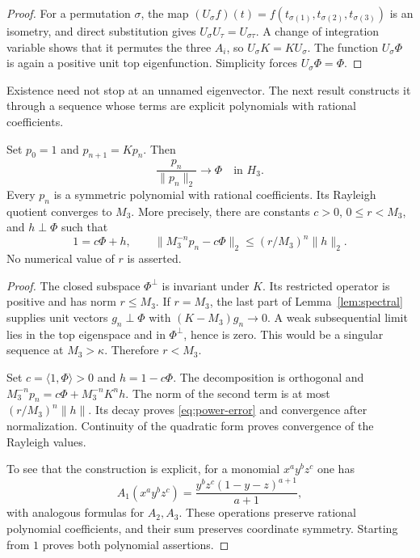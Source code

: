 \documentclass[11pt]{article}
\newcommand{\ip}[2]{\langle #1,#2\rangle}
\newcommand{\norm}[1]{\lVert #1\rVert}
\begin{document}
\begin{proof}
For a permutation $\sigma$, the map
$(U_\sigma f)(t)=f(t_{\sigma(1)},t_{\sigma(2)},t_{\sigma(3)})$
is an isometry, and direct substitution gives
$U_\sigma U_\tau=U_{\sigma\tau}$.
A change of integration variable shows that it permutes
the three $A_i$, so $U_\sigma K=KU_\sigma$.
The function $U_\sigma\Phi$ is again a positive unit top eigenfunction.
Simplicity forces $U_\sigma\Phi=\Phi$.
\end{proof}

Existence need not stop at an unnamed eigenvector.
The next result constructs it through a sequence whose terms are explicit
polynomials with rational coefficients.

\begin{theorem}\label{thm:power}
Set $p_0=1$ and $p_{n+1}=Kp_n$.  Then
\[
                   \frac{p_n}{\norm{p_n}_2}\longrightarrow\Phi
                         \quad\text{in }H_3.
\]
Every $p_n$ is a symmetric polynomial with rational coefficients.
Its Rayleigh quotient converges to $M_3$.
More precisely, there are constants $c>0$, $0\leq r<M_3$, and
$h\perp\Phi$ such that
\begin{equation}\label{eq:power-error}
 1=c\Phi+h,
 \qquad\norm{M_3^{-n}p_n-c\Phi}_2
               \leq(r/M_3)^n\norm h_2.
\end{equation}
No numerical value of $r$ is asserted.
\end{theorem}

\begin{proof}
The closed subspace $\Phi^\perp$ is invariant under $K$.
Its restricted operator is positive and has norm $r\leq M_3$.
If $r=M_3$, the last part of Lemma~\ref{lem:spectral} supplies unit
vectors $g_n\perp\Phi$ with $(K-M_3)g_n\to0$.
A weak subsequential limit lies in the top eigenspace and in
$\Phi^\perp$, hence is zero.
This would be a singular sequence at $M_3>\kappa$.
Therefore $r<M_3$.

Set $c=\ip1\Phi>0$ and $h=1-c\Phi$.
The decomposition is orthogonal and
$M_3^{-n}p_n=c\Phi+M_3^{-n}K^nh$.
The norm of the second term is at most $(r/M_3)^n\norm h$.
Its decay proves \eqref{eq:power-error} and convergence after normalization.
Continuity of the quadratic form proves convergence of the Rayleigh values.

To see that the construction is explicit, for a monomial
$x^ay^bz^c$ one has
\[
 A_1(x^ay^bz^c)=\frac{y^bz^c(1-y-z)^{a+1}}{a+1},
\]
with analogous formulas for $A_2,A_3$.
These operations preserve rational polynomial coefficients, and their
sum preserves coordinate symmetry.
Starting from $1$ proves both polynomial assertions.
\end{proof}
\end{document}
